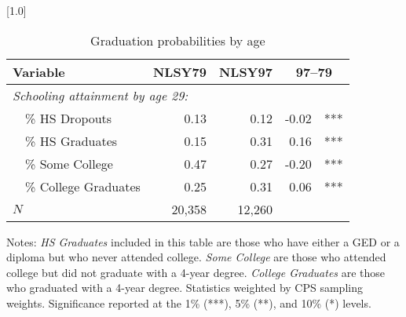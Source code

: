 \begin{table}[ht]
\caption{Graduation probabilities by age}
\label{tab:gradprobsCPS}
\centering
\scalebox{1.0}[1.0]{%
\begin{threeparttable}
\begin{tabular}{lrrr@{}l}
\toprule 
Variable & NLSY79 & NLSY97 & \multicolumn{2}{c}{97--79} \\
\midrule 
\multicolumn{5}{l}{\emph{Schooling attainment by age 29:}} \\
~~\% HS Dropouts  & 0.13 & 0.12 & -0.02 & *** \\ 
~~\% HS Graduates  & 0.15 & 0.31 & 0.16 & *** \\ 
~~\% Some College  & 0.47 & 0.27 & -0.20 & *** \\ 
~~\% College Graduates  & 0.25 & 0.31 & 0.06 & *** \\ 
$N$  & 20,358 & 12,260 & & \\ 
\bottomrule 
\end{tabular} 
\footnotesize{Notes: \emph{HS Graduates} included in this table are those who have either a GED or a diploma but who never attended college. \emph{Some College} are those who attended college but did not graduate with a 4-year degree. \emph{College Graduates} are those who graduated with a 4-year degree. Statistics weighted by CPS sampling weights. Significance reported at the 1\% (***), 5\% (**), and 10\% (*) levels.}
\end{threeparttable} 
} 
\end{table} 

